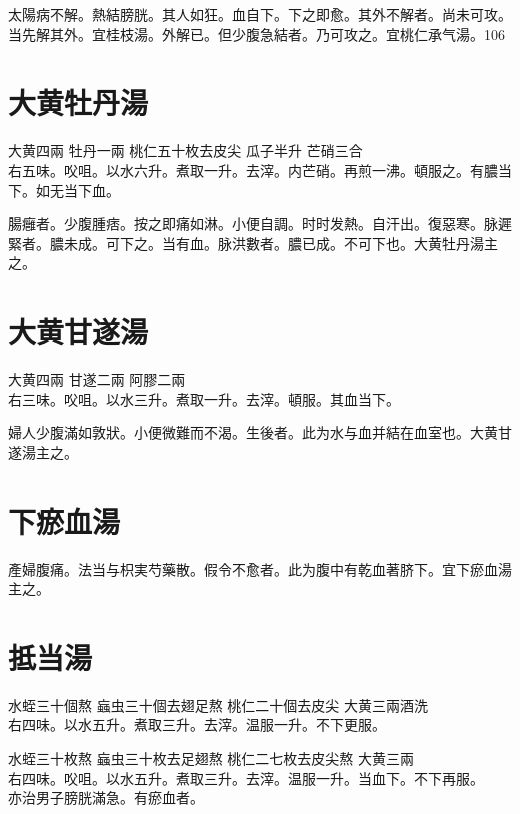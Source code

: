 太陽病不解。熱結膀胱。其人如狂。血自下。下之即愈。其外不解者。尚未可攻。当先解其外。{\khaaitp 宜桂枝湯。}外解已。{\khaaitp 但}少腹急結者。乃可攻之。宜桃仁承气湯。106

\section{大黄牡丹湯}

大黄{\scriptsize 四兩} 牡丹{\scriptsize 一兩} 桃仁{\scriptsize 五十枚去皮尖} 瓜子{\scriptsize 半升} 芒硝{\scriptsize 三合}\\
右五味。㕮咀。以水六升。煮取一升。去滓。内芒硝。再煎一沸。頓服之。有膿当下。如无当下血。

腸癰者。少腹腫痞。按之即痛如淋。小便自調。时时发熱。自汗出。復惡寒。脉遲緊者。膿未成。可下之。当有血。脉洪數者。膿已成。不可下也。大黄牡丹湯主之。

\section{大黄甘遂湯}

大黄{\scriptsize 四兩} 甘遂{\scriptsize 二兩} 阿膠{\scriptsize 二兩}\\
右三味。㕮咀。以水三升。煮取一升。去滓。頓服。其血当下。

婦人少腹滿如敦狀。小便微難而不渴。生後者。此为水与血并結在血室也。大黄甘遂湯主之。

\section{下瘀血湯}

產婦腹痛。法当与枳実芍藥散。假令不愈者。此为腹中有乾血著脐下。宜下瘀血湯主之。

\section{抵当湯}

水蛭{\scriptsize 三十個熬} 蝱虫{\scriptsize 三十個去翅足熬} 桃仁{\scriptsize 二十個去皮尖} 大黄{\scriptsize 三兩酒洗}\\
右四味。以水五升。煮取三升。去滓。温服一升。不下更服。{\zhaoben}

水蛭{\scriptsize 三十枚熬} 蝱虫{\scriptsize 三十枚去足翅熬} 桃仁{\scriptsize 二七枚去皮尖熬} 大黄{\scriptsize 三兩}\\
右四味。㕮咀。以水五升。煮取三升。去滓。温服一升。当血下。不下再服。\\
亦治男子膀胱滿急。有瘀血者。{\wuben}

